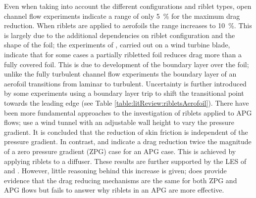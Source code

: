 \documentclass[12pt,oneside,a4paper]{article}
\begin{document}
%
 Even when taking into account the different configurations and riblet types, open channel flow experiments indicate a range of only \SI{5}{\%} for the maximum drag reduction. When riblets are applied to aerofoils the range increases to \SI{10}{\%}. This is largely due to the additional dependencies on riblet configuration and the shape of the foil; the experiments of \cite{chamorro2013}, carried out on a wind turbine blade, indicate that for some cases a partially ribletted foil reduces drag more than a fully covered foil. This is due to development of the boundary layer over the foil; unlike the fully turbulent channel flow experiments the boundary layer of an aerofoil transitions from laminar to turbulent. Uncertainty is further introduced by some experiments using a boundary layer trip to shift the transitional point towards the leading edge (see Table \ref{table:litReview:ribletsAerofoil}). There have been more fundamental approaches to the investigation of riblets applied to APG flows; \cite{choi1990} use a wind tunnel with an adjustable wall height to vary the pressure gradient. It is concluded that the reduction of skin friction is independent of the pressure gradient. In contrast, \cite{nieuwstadt1993} and \cite{debisschop1996} indicate a drag reduction twice the magnitude of a zero pressure gradient (ZPG) case for an APG case. This is achieved by applying riblets to a diffuser. These results are further supported by the LES of \cite{klumpp2010} and \cite{boomsma2015}. However, little reasoning behind this increase is given; \cite{boomsma2015} does provide evidence that the drag reducing mechanisms are the same for both ZPG and APG flows but fails to answer why riblets in an APG are more effective.
\end{document}
